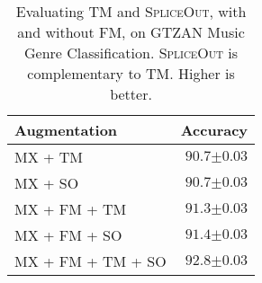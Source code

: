 \documentclass{article}
\newcommand{\SpA}{{\textsc{SpliceOut}}\xspace}
\begin{document}
\begin{table}
    \centering
    \caption{Evaluating TM and \SpA, with and without FM, on GTZAN Music Genre Classification. \SpA is complementary to TM. Higher is better.}
    \begin{tabular}{l|r}
    \toprule
         Augmentation & Accuracy \\
    \midrule
    MX + TM & $90.7{\scriptstyle \pm 0.03}$\\
    MX + SO & $90.7{\scriptstyle \pm 0.03}$\\
    \midrule
    MX + FM + TM~\citep{panns} & $91.3{\scriptstyle \pm 0.03}$\\
    MX + FM + SO & $\mathbf{91.4}{\scriptstyle \pm 0.03}$\\
    \midrule
    MX + FM + TM + SO & $\mathbf{92.8}{\scriptstyle \pm 0.03}$\\
    \bottomrule
    \end{tabular}
    \label{tab:music}
\end{table}
\end{document}
